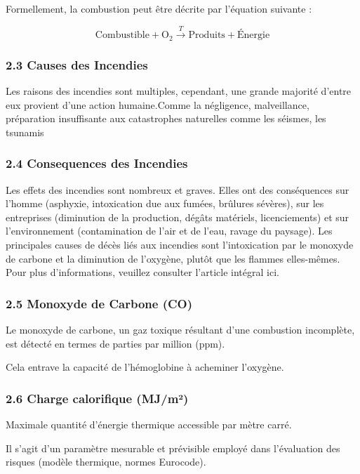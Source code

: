 \documentclass[
]{article}
\begin{document}
Formellement, la combustion peut être décrite par l'équation suivante :

\[
\text{Combustible} + \text{O}_2 \xrightarrow{T} \text{Produits} + \text{Énergie}
\]

\subsubsection{2.3 Causes des Incendies}\label{causes-des-incendies}

Les raisons des incendies sont multiples, cependant, une grande majorité
d'entre eux provient d'une action humaine.Comme la négligence,
malveillance, préparation insuffisante aux catastrophes naturelles comme
les séismes, les tsunamis

\subsubsection{2.4 Consequences des
Incendies}\label{consequences-des-incendies}

Les effets des incendies sont nombreux et graves. Elles ont des
conséquences sur l'homme (asphyxie, intoxication due aux fumées,
brûlures sévères), sur les entreprises (diminution de la production,
dégâts matériels, licenciements) et sur l'environnement (contamination
de l'air et de l'eau, ravage du paysage). Les principales causes de
décès liés aux incendies sont l'intoxication par le monoxyde de carbone
et la diminution de l'oxygène, plutôt que les flammes elles-mêmes. Pour
plus d'informations, veuillez consulter l'article intégral ici.

\subsubsection{2.5 Monoxyde de Carbone
(CO)}\label{monoxyde-de-carbone-co}

Le monoxyde de carbone, un gaz toxique résultant d'une combustion
incomplète, est détecté en termes de parties par million (ppm).

Cela entrave la capacité de l'hémoglobine à acheminer l'oxygène.

\subsubsection{2.6 Charge calorifique
(MJ/m²)}\label{charge-calorifique-mjmuxb2}

Maximale quantité d'énergie thermique accessible par mètre carré.

Il s'agit d'un paramètre mesurable et prévisible employé dans
l'évaluation des risques (modèle thermique, normes Eurocode).
\end{document}
